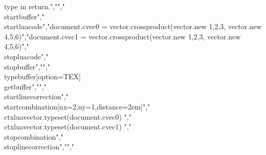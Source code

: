 type in return.","","\\startbuffer","\\startluacode","document.cvec0 = vector.crossproduct(vector.new {{1,2,3}},     vector.new {{4,5,6}})","document.cvec1 = vector.crossproduct(vector.new {{1},{2},{3}}, vector.new {{4},{5},{6}})","\\stopluacode","\\stopbuffer","","\\typebuffer[option=TEX] \\getbuffer","","\\startlinecorrection","\\startcombination[nx=2,ny=1,distance=2em]","    {\\ctxlua{vector.typeset(document.cvec0)}} {}","    {\\ctxlua{vector.typeset(document.cvec1)}} {}","\\stopcombination","\\stoplinecorrection","","%